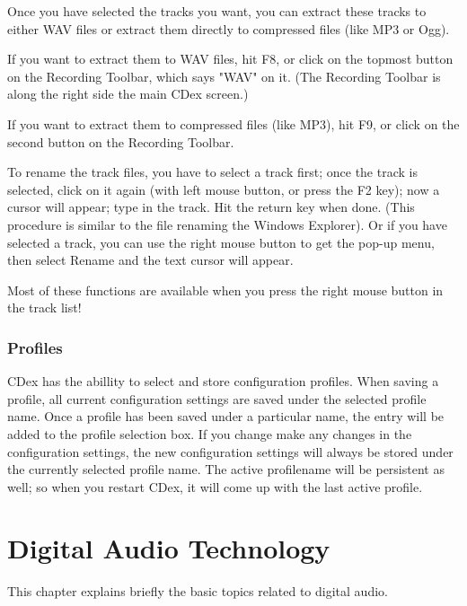 Once you have selected the tracks you want, you can extract these tracks to either WAV
files or extract them directly to compressed files (like MP3 or Ogg).

If you want to extract them to WAV files, hit F8, or click on the topmost
button on the Recording Toolbar, which says "WAV" on it.
(The Recording Toolbar is along the right side the main CDex screen.)

If you want to extract them to compressed files (like MP3), hit F9, or click
on the second button on the Recording Toolbar.

To rename the track files, you have to select a track first; once the track
is selected, click on it again (with left mouse button, or press the F2 key);
now a cursor will appear; type in the track.  Hit the return key when done.
(This procedure is similar to the file renaming the Windows Explorer). Or
if you have selected a track, you can use the right mouse button to get the
pop-up menu, then select Rename and the text cursor will appear.

Most of these functions are available when you press the right mouse button
in the track list!

\subsection{Profiles}
CDex has the abillity to select and store configuration profiles. When saving a profile,
all current configuration settings are saved under the selected profile name.
Once a profile has been saved under a particular name, the entry will be added 
to the profile selection box. If you change make any changes in the configuration 
settings, the new configuration settings will always be stored under the currently
selected profile name. The active profilename will be persistent as well; 
so when you restart CDex, it will come up with the last active profile.


\chapter{Digital Audio Technology}
\setfooter{\thepage}{}{}{}{}{\thepage}

This chapter explains briefly the basic topics related to digital audio.


